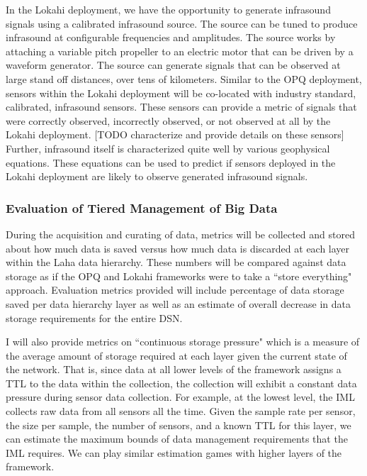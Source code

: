 In the Lokahi deployment, we have the opportunity to generate infrasound signals using a calibrated infrasound source. The source can be tuned to produce infrasound at configurable frequencies and amplitudes. The source works by attaching a variable pitch propeller to an electric motor that can be driven by a waveform generator. The source can generate signals that can be observed at large stand off distances, over tens of kilometers. Similar to the OPQ deployment, sensors within the Lokahi deployment will be co-located with industry standard, calibrated, infrasound sensors. These sensors can provide a metric of signals that were correctly observed, incorrectly observed, or not observed at all by the Lokahi deployment. [TODO characterize and provide details on these sensors] Further, infrasound itself is characterized quite well by various geophysical equations. These equations can be used to predict if sensors deployed in the Lokahi deployment are likely to observe generated infrasound signals.

\subsubsection{Evaluation of Tiered Management of Big Data}
During the acquisition and curating of data, metrics will be collected and stored about how much data is saved versus how much data is discarded at each layer within the Laha data hierarchy. These numbers will be compared against data storage as if the OPQ and Lokahi frameworks were to take a ``store everything" approach. Evaluation metrics provided will include percentage of data storage saved per data hierarchy layer as well as an estimate of overall decrease in data storage requirements for the entire DSN. 

I will also provide metrics on ``continuous storage pressure" which is a measure of the average amount of storage required at each layer given the current state of the network. That is, since data at all lower levels of the framework assigns a TTL to the data within the collection, the collection will exhibit a constant data pressure during sensor data collection. For example, at the lowest level, the IML collects raw data from all sensors all the time. Given the sample rate per sensor, the size per sample, the number of sensors, and a known TTL for this layer, we can estimate the maximum bounds of data management requirements that the IML requires. We can play similar estimation games with higher layers of the framework.

